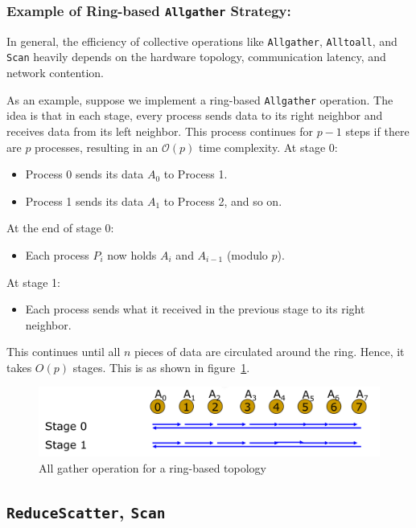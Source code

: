 \documentclass[12pt]{book}
\begin{document}
\subsubsection{Example of Ring-based \texttt{Allgather} Strategy:}\label{subsubsec:allgatherring}
In general, the efficiency of collective operations like \texttt{Allgather}, \texttt{Alltoall}, and \texttt{Scan} heavily depends on the hardware topology, communication latency, and network contention.

As an example, suppose we implement a ring-based \texttt{Allgather} operation. The idea is that in each stage, every process sends data to its right neighbor and receives data from its left neighbor. This process continues for $p - 1$ steps if there are $p$ processes, resulting in an $\mathcal{O}(p)$ time complexity.
At stage 0:
\begin{itemize}
    \item Process 0 sends its data $A_0$ to Process 1.
    \item Process 1 sends its data $A_1$ to Process 2, and so on.
\end{itemize}

At the end of stage 0:
\begin{itemize}
    \item Each process $P_i$ now holds $A_i$ and $A_{i-1}$ (modulo $p$).
\end{itemize}

At stage 1:
\begin{itemize}
    \item Each process sends what it received in the previous stage to its right neighbor.
\end{itemize}

This continues until all $n$ pieces of data are circulated around the ring. Hence, it takes $O(p)$ stages. This is as shown in figure~\ref{fig:allgather_examp}.
\begin{figure}[ht]
    \centering
    \includegraphics[width=0.75\linewidth]{images/allgather_examp.png}
    \caption{All gather operation for a ring-based topology}
    \label{fig:allgather_examp}
\end{figure} 

\subsection{\texttt{ReduceScatter}, \texttt{Scan}}
\end{document}
